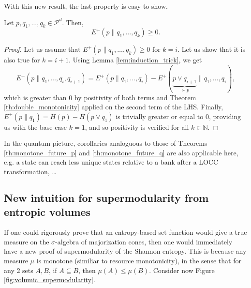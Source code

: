 \noindent With this new result, the last property is easy to show.

\begin{theorem}
    Let $p, q_1, \dots, q_k \in \mathcal{P}^d$. Then,
    \begin{equation}
        E^+(p \parallel q_1, \dots, q_k) \geq 0.
    \end{equation}
\end{theorem}

\begin{proof}
    Let us assume that $E^+(p \parallel q_1, \dots, q_k) \geq 0$ for $k = i$. Let us show that it is also true for $k = i+1$. Using Lemma \ref{lem:induction_trick}, we get
    \begin{equation}
        E^+(p \parallel q_1, \dots, q_i, q_{i+1}) = E^+(p \parallel q_1, \dots, q_i) - E^+(\underbrace{p \vee q_{i+1}}_{\succ p} \parallel q_1, \dots, q_i),
    \end{equation}
    which is greater than 0 by positivity of both terms and Theorem \ref{th:double_monotonicity} applied on the second term of the LHS. Finally, $E^+(p \parallel q_1) = H(p) - H(p \vee q_1)$ is trivially greater or equal to 0, providing us with the base case $k = 1$, and so positivity is verified for all $k \in \mathbb{N}$. \qedhere
\end{proof}

In the quantum picture, corollaries analoguous to those of Theorems \ref{th:monotone_future_p} and \ref{th:monotone_future_q} are also applicable here, e.g. a state can reach less unique states relative to a bank after a LOCC transformation, \dots



\subsection{New intuition for supermodularity from entropic volumes} \label{sec:supermodularity_intuition}

If one could rigorously prove that an entropy-based set function would give a true measure on the $\sigma$-algebra of majorization cones, then one would immediately have a new proof of supermodularity of the Shannon entropy. This is because any measure $\mu$ is monotone (similiar to resource monotonicity), in the sense that for any 2 sets $A, B$, if $A \subseteq B$, then $\mu(A) \leq \mu(B)$. Consider now Figure \ref{fig:volumic_supermodularity}.

